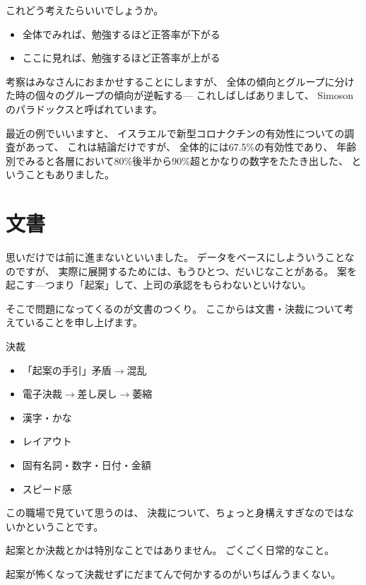 \documentclass[uplatex,jis2004,dvipdfmx,12pt]{jsarticle}
\begin{document}
これどう考えたらいいでしょうか。

\begin{itemize}
 \item 全体でみれば、勉強するほど正答率が下がる
 \item ここに見れば、勉強するほど正答率が上がる
\end{itemize}
考察はみなさんにおまかせすることにしますが、
全体の傾向とグループに分けた時の個々のグループの傾向が逆転する---
これしばしばありまして、
Simosonのパラドックスと呼ばれています。

最近の例でいいますと、
イスラエルで新型コロナクチンの有効性についての調査があって、
これは結論だけですが、
全体的には67.5\%の有効性であり、
年齢別でみると各層において80\%後半から90\%超とかなりの数字をたたき出した、
ということもありました。

\section{文書}

思いだけでは前に進まないといいました。
データをベースにしよういうことなのですが、
実際に展開するためには、もうひとつ、だいじなことがある。
案を起こす---つまり「起案」して、上司の承認をもらわないといけない。

そこで問題になってくるのが文書のつくり。
ここからは文書・決裁について考えていることを申し上げます。




決裁
       \begin{itemize}
	\item 「起案の手引」矛盾$\longrightarrow${}混乱
	\item 電子決裁$\longrightarrow${}差し戻し$\longrightarrow${}萎縮
	\item 漢字・かな
	\item レイアウト
	\item 固有名詞・数字・日付・金額
	\item スピード感
   \end{itemize}
\fi


この職場で見ていて思うのは、
決裁について、ちょっと身構えすぎなのではないかということです。

起案とか決裁とかは特別なことではありません。
ごくごく日常的なこと。

起案が怖くなって決裁せずにだまてんで何かするのがいちばんうまくない。
\end{document}
